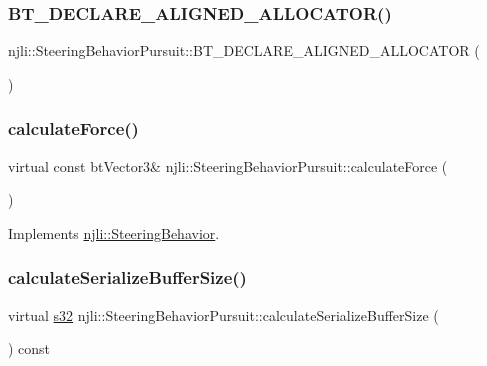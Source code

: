 \subsubsection{\texorpdfstring{B\+T\+\_\+\+D\+E\+C\+L\+A\+R\+E\+\_\+\+A\+L\+I\+G\+N\+E\+D\+\_\+\+A\+L\+L\+O\+C\+A\+T\+O\+R()}{BT\_DECLARE\_ALIGNED\_ALLOCATOR()}}
{\footnotesize\ttfamily njli\+::\+Steering\+Behavior\+Pursuit\+::\+B\+T\+\_\+\+D\+E\+C\+L\+A\+R\+E\+\_\+\+A\+L\+I\+G\+N\+E\+D\+\_\+\+A\+L\+L\+O\+C\+A\+T\+OR (\begin{DoxyParamCaption}{ }\end{DoxyParamCaption})\hspace{0.3cm}{\ttfamily [protected]}}

\mbox{\label{classnjli_1_1_steering_behavior_pursuit_a8b7df550e112b795f0e076873a99a86d}} 
\subsubsection{\texorpdfstring{calculate\+Force()}{calculateForce()}}
{\footnotesize\ttfamily virtual const bt\+Vector3\& njli\+::\+Steering\+Behavior\+Pursuit\+::calculate\+Force (\begin{DoxyParamCaption}{ }\end{DoxyParamCaption})\hspace{0.3cm}{\ttfamily [virtual]}}



Implements \mbox{\hyperlink{classnjli_1_1_steering_behavior_a9720953de1268f658636213946d76ed3}{njli\+::\+Steering\+Behavior}}.

\mbox{\label{classnjli_1_1_steering_behavior_pursuit_a5aab9694bf662d9f1cd8ad242b66d954}} 
\subsubsection{\texorpdfstring{calculate\+Serialize\+Buffer\+Size()}{calculateSerializeBufferSize()}}
{\footnotesize\ttfamily virtual \mbox{\hyperlink{_util_8h_aa62c75d314a0d1f37f79c4b73b2292e2}{s32}} njli\+::\+Steering\+Behavior\+Pursuit\+::calculate\+Serialize\+Buffer\+Size (\begin{DoxyParamCaption}{ }\end{DoxyParamCaption}) const\hspace{0.3cm}{\ttfamily [virtual]}}


